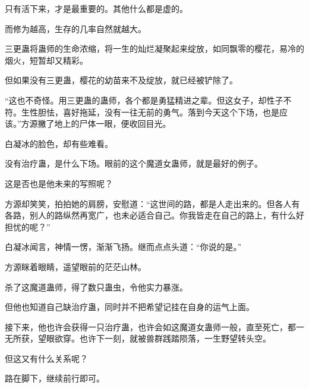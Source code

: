 \begin{this_body}
只有活下来，才是最重要的。其他什么都是虚的。

而修为越高，生存的几率自然就越大。

三更蛊将蛊师的生命浓缩，将一生的灿烂凝聚起来绽放，如同飘零的樱花，易冷的烟火，短暂却又精彩。

但如果没有三更蛊，樱花的幼苗来不及绽放，就已经被铲除了。

“这也不奇怪。用三更蛊的蛊师，各个都是勇猛精进之辈。但这女子，却性子不符。生性胆怯，喜好拖延，没有一往无前的勇气。落到今天这个下场，也是应该。”方源撇了地上的尸体一眼，便收回目光。

白凝冰的脸色，却有些难看。

没有治疗蛊，是什么下场。眼前的这个魔道女蛊师，就是最好的例子。

这是否也是他未来的写照呢？

方源却笑笑，拍拍她的肩膀，安慰道：“这世间的路，都是人走出来的。但各人有各路，别人的路纵然再宽广，也未必适合自己。你我皆走在自己的路上，有什么好担忧的呢？”

白凝冰闻言，神情一愣，渐渐飞扬。继而点点头道：“你说的是。”

方源眯着眼睛，遥望眼前的茫茫山林。

杀了这魔道蛊师，得了数只蛊虫，令他实力暴涨。

但他也知道自己缺治疗蛊，同时并不把希望记挂在自身的运气上面。

接下来，他也许会获得一只治疗蛊，也许会如这魔道女蛊师一般，直至死亡，都一无所获，望眼欲穿。也许下一刻，就被兽群践踏陨落，一生野望转头空。

但这又有什么关系呢？

路在脚下，继续前行即可。

\end{this_body}

